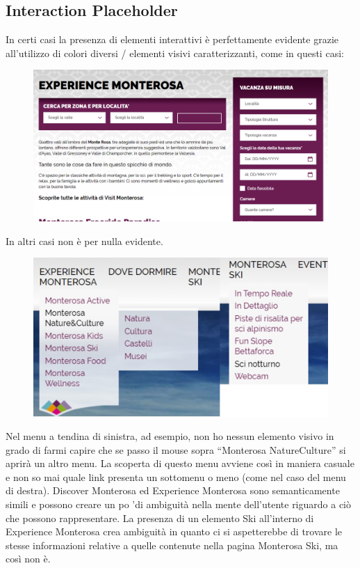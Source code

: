         \subsection{Interaction Placeholder}
        In certi casi la presenza di elementi interattivi è perfettamente
        evidente grazie all’utilizzo di colori diversi / elementi visivi
        caratterizzanti, come in questi casi:
        \begin{figure}[H]
            \includegraphics[scale=0.2]{resources/images/interactionPlaceholder1.png}
        \end{figure}
        In altri casi non è per nulla evidente.
        \begin{figure}[H]
            \includegraphics[scale=0.3]{resources/images/interactionPlaceholderFinal.jpg}
        \end{figure}
        Nel menu a tendina di sinistra, ad esempio, non ho nessun elemento visivo in
        grado di farmi capire che se passo il mouse sopra “Monterosa NatureCulture” si
        aprirà un altro menu. La scoperta di questo menu avviene così in maniera casuale
        e non so mai quale link presenta un sottomenu o meno (come nel caso del menu di destra).
        Discover Monterosa ed Experience Monterosa sono semanticamente simili e
        possono creare un po 'di ambiguità nella mente dell'utente riguardo a
        ciò che possono rappresentare.
        La presenza di un elemento Ski all'interno di Experience Monterosa crea
        ambiguità in quanto ci si aspetterebbe di trovare le stesse informazioni
        relative a quelle contenute nella pagina Monterosa Ski, ma così non è.
